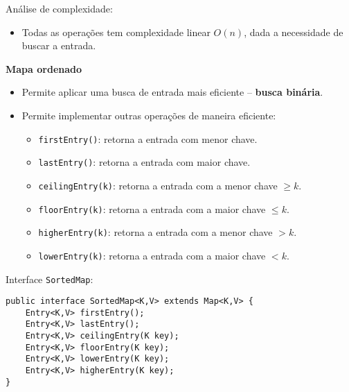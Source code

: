 \medskip

Análise de complexidade:
\begin{itemize}
	\item Todas as operações tem complexidade linear $O(n)$, dada a necessidade de buscar a entrada.
\end{itemize}

\clearpage

\textbf{Mapa ordenado}
\begin{itemize}
	\item Permite aplicar uma busca de entrada mais eficiente -- \textbf{busca binária}.
	\item Permite implementar outras operações de maneira eficiente:
	\begin{itemize}
		\item \texttt{firstEntry()}: retorna a entrada com menor chave.
		\item \texttt{lastEntry()}: retorna a entrada com maior chave.
		\item \texttt{ceilingEntry(k)}: retorna a entrada com a menor chave $\ge k$.
		\item \texttt{floorEntry(k)}: retorna a entrada com a maior chave $\le k$.
		\item \texttt{higherEntry(k)}: retorna a entrada com a menor chave $> k$.
		\item \texttt{lowerEntry(k)}: retorna a entrada com a maior chave $< k$.
	\end{itemize}
\end{itemize}

\bigskip

Interface \texttt{SortedMap}:
\begin{verbatim}
public interface SortedMap<K,V> extends Map<K,V> {
	Entry<K,V> firstEntry();
	Entry<K,V> lastEntry();
	Entry<K,V> ceilingEntry(K key);
	Entry<K,V> floorEntry(K key);
	Entry<K,V> lowerEntry(K key);
	Entry<K,V> higherEntry(K key);
}
\end{verbatim}

\medskip

